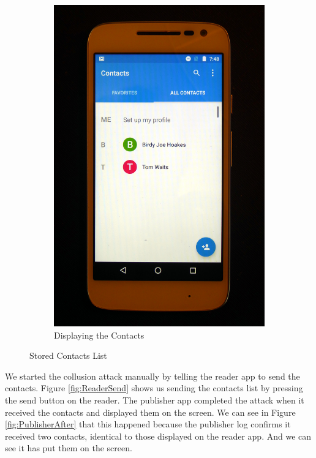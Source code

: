 \begin{figure}[h!]
\begin{subfigure}{0.49\textwidth}
        \includegraphics[height=0.45\textheight]{graphics/PhonePhotos/03 - DisplayContacts.jpg}
        \caption{Displaying the Contacts}
        \label{fig:DisplayingContacts}
	\end{subfigure}
	\caption{Stored Contacts List}
	\label{fig:ContactsList}
\end{figure}

We started the collusion attack manually by telling the reader app to send the contacts.  Figure \ref{fig:ReaderSend} shows us sending the contacts list by pressing the send button on the reader.  The publisher app completed the attack when it received the contacts and displayed them on the screen.  We can see in Figure \ref{fig:PublisherAfter} that this happened because the publisher log confirms it received two contacts, identical to those displayed on the reader app.  And we can see it has put them on the screen.

